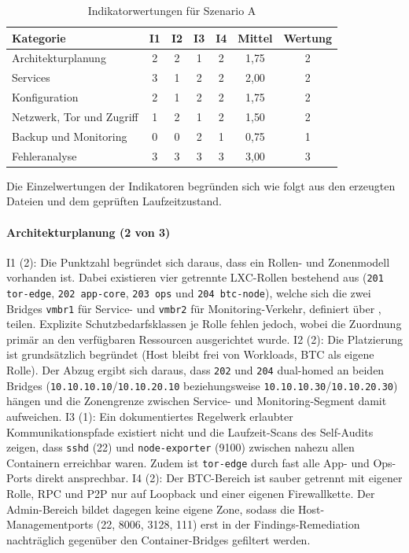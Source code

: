 \begin{table}[H]
\centering
\small
\begin{tabular}{p{} c c c c c c}
\hline
\textbf{Kategorie} & \textbf{I1} & \textbf{I2} & \textbf{I3} & \textbf{I4} & \textbf{Mittel} & \textbf{Wertung} \\
\hline
Architekturplanung        & 2 & 2 & 1 & 2 & 1{,}75 & 2 \\
Services                  & 3 & 1 & 2 & 2 & 2{,}00 & 2 \\
Konfiguration             & 2 & 1 & 2 & 2 & 1{,}75 & 2 \\
Netzwerk, Tor und Zugriff & 1 & 2 & 1 & 2 & 1{,}50 & 2 \\
Backup und Monitoring     & 0 & 0 & 2 & 1 & 0{,}75 & 1 \\
Fehleranalyse             & 3 & 3 & 3 & 3 & 3{,}00 & 3 \\
\hline
\end{tabular}
\caption{Indikatorwertungen für Szenario A}
\label{tab:indikatoren-a}
\end{table}

Die Einzelwertungen der Indikatoren begründen sich wie folgt aus den erzeugten
Dateien und dem geprüften Laufzeitzustand.

\paragraph{Architekturplanung (2 von 3)}
I1 (2): Die Punktzahl begründet sich daraus, dass ein Rollen- und Zonenmodell vorhanden ist.
Dabei existieren vier getrennte \ac{LXC}-Rollen bestehend aus (\texttt{201 tor-edge}, \texttt{202 app-core}, \texttt{203 ops} und \texttt{204 btc-node}), welche sich die zwei Bridges \texttt{vmbr1} für Service- und \texttt{vmbr2} für Monitoring-Verkehr, definiert über , teilen. 
Explizite
Schutzbedarfsklassen je Rolle fehlen jedoch, wobei die Zuordnung primär an den
verfügbaren Ressourcen ausgerichtet wurde.\cite{runbookA}
I2 (2): Die Platzierung ist grundsätzlich begründet (Host bleibt frei von Workloads, \ac{BTC} als eigene Rolle). 
Der Abzug ergibt sich daraus, dass \texttt{202} und \texttt{204} dual-homed an beiden Bridges 
(\texttt{10.10.10.10}/\texttt{10.10.20.10} beziehungsweise
\texttt{10.10.10.30}/\texttt{10.10.20.30}) hängen und die Zonengrenze zwischen Service- und Monitoring-Segment damit aufweichen.\cite{runbookA}
I3 (1): Ein dokumentiertes Regelwerk erlaubter Kommunikationspfade existiert nicht und die Laufzeit-Scans des Self-Audits zeigen, dass \texttt{sshd} (22) und \texttt{node-exporter} (9100) zwischen nahezu allen Containern erreichbar waren. Zudem ist \texttt{tor-edge} durch fast alle App- und Ops-Ports direkt ansprechbar.\cite{selfauditA}
I4 (2): Der \ac{BTC}-Bereich ist sauber getrennt mit eigener Rolle, \ac{RPC} und \ac{P2P} nur
auf Loopback und einer eigenen Firewallkette. 
Der Admin-Bereich bildet dagegen keine eigene Zone, sodass die Host-Managementports (22, 8006, 3128, 111) erst in der Findings-Remediation nachträglich gegenüber den Container-Bridges gefiltert werden.\cite{runbookA,selfauditA}

